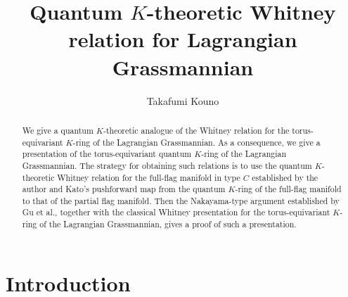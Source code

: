\documentclass[a4paper, 11pt, reqno]{amsart}
\title{Quantum $K$-theoretic Whitney relation for Lagrangian Grassmannian}
\author{Takafumi Kouno}
\numberwithin{equation}{section}
\theoremstyle{plain}
\theoremstyle{definition}
\theoremstyle{remark}
\begin{document}
\begin{abstract}
We give a quantum $K$-theoretic analogue of the Whitney relation for the torus-equivariant $K$-ring of the Lagrangian Grassmannian. As a consequence, we give a presentation of the torus-equivariant quantum $K$-ring of the Lagrangian Grassmannian. The strategy for obtaining such relations is to use the quantum $K$-theoretic Whitney relation for the full-flag manifold in type $C$ established by the author and Kato's pushforward map from the quantum $K$-ring of the full-flag manifold to that of the partial flag manifold. Then the Nakayama-type argument established by Gu et al., together with the classical Whitney presentation for the torus-equivariant $K$-ring of the Lagrangian Grassmannian, gives a proof of such a presentation. 
\end{abstract}

\maketitle

\section{Introduction}
\end{document}
